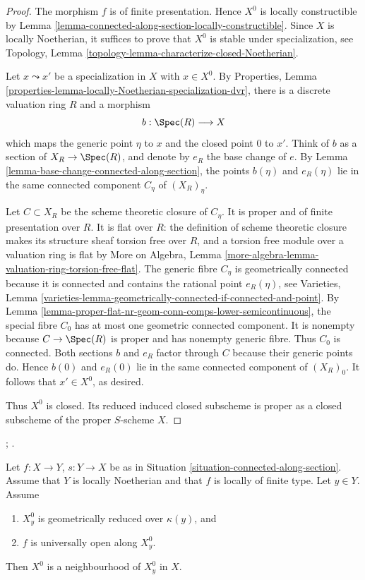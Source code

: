 \begin{proof}
The morphism $f$ is of finite presentation. Hence $X^0$ is locally
constructible by
Lemma \ref{lemma-connected-along-section-locally-constructible}. Since $X$
is locally Noetherian, it suffices to prove that $X^0$ is stable under
specialization, see Topology, Lemma
\ref{topology-lemma-characterize-closed-Noetherian}.

Let $x \leadsto x'$ be a specialization in $X$ with $x \in X^0$. By
Properties, Lemma
\ref{properties-lemma-locally-Noetherian-specialization-dvr}, there is a
discrete valuation ring $R$ and a morphism
$$
b : \Spec(R) \longrightarrow X
$$
which maps the generic point $\eta$ to $x$ and the closed point $0$ to $x'$.
Think of $b$ as a section of $X_R \to \Spec(R)$, and denote by $e_R$ the
base change of $e$. By
Lemma \ref{lemma-base-change-connected-along-section}, the points $b(\eta)$
and $e_R(\eta)$ lie in the same connected component $C_\eta$ of
$(X_R)_\eta$.

Let $C \subset X_R$ be the scheme theoretic closure of $C_\eta$. It is
proper and of finite presentation over $R$. It is flat over $R$: the
definition of scheme theoretic closure makes its structure sheaf
torsion free over $R$, and a torsion free module over a valuation ring is
flat by More on Algebra, Lemma
\ref{more-algebra-lemma-valuation-ring-torsion-free-flat}. The generic fibre
$C_\eta$ is geometrically connected because it is connected and contains
the rational point $e_R(\eta)$, see Varieties, Lemma
\ref{varieties-lemma-geometrically-connected-if-connected-and-point}.
By Lemma
\ref{lemma-proper-flat-nr-geom-conn-comps-lower-semicontinuous}, the special
fibre $C_0$ has at most one geometric connected component. It is nonempty
because $C \to \Spec(R)$ is proper and has nonempty generic fibre. Thus
$C_0$ is connected. Both sections $b$ and $e_R$ factor through $C$ because
their generic points do. Hence $b(0)$ and $e_R(0)$ lie in the same connected
component of $(X_R)_0$. It follows that $x' \in X^0$, as desired.

Thus $X^0$ is closed. Its reduced induced closed subscheme is proper as a
closed subscheme of the proper $S$-scheme $X$.
\end{proof}

\begin{lemma}
\label{lemma-connected-along-section-universally-open-neighbourhood}
\begin{reference}
\cite[IV, Proposition 15.6.4]{EGA};
\cite[Expos\'e 236, Corollary 1.7, p. 229]{FGA}.
\end{reference}
Let $f : X \to Y$, $s : Y \to X$ be as in
Situation \ref{situation-connected-along-section}. Assume that $Y$ is
locally Noetherian and that $f$ is locally of finite type. Let $y \in Y$.
Assume
\begin{enumerate}
\item $X_y^0$ is geometrically reduced over $\kappa(y)$, and
\item $f$ is universally open along $X_y^0$.
\end{enumerate}
Then $X^0$ is a neighbourhood of $X_y^0$ in $X$.
\end{lemma}

